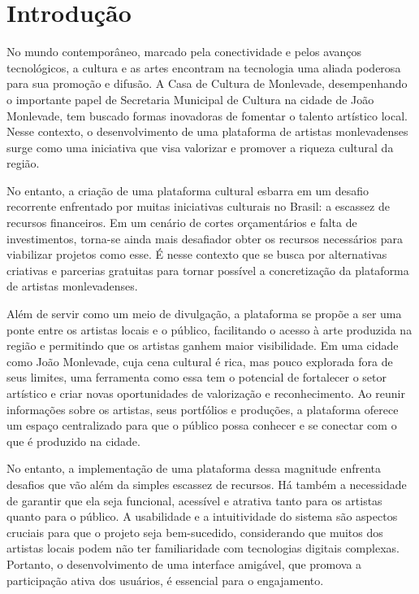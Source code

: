 \chapter{Introdução}
\label{cap:introducao}

No mundo contemporâneo, marcado pela conectividade e pelos avanços tecnológicos, a cultura e as artes encontram na tecnologia uma aliada poderosa para sua promoção e difusão. A Casa de Cultura de Monlevade, desempenhando o importante papel de Secretaria Municipal de Cultura na cidade de João Monlevade, tem buscado formas inovadoras de fomentar o talento artístico local. Nesse contexto, o desenvolvimento de uma plataforma de artistas monlevadenses surge como uma iniciativa que visa valorizar e promover a riqueza cultural da região.

No entanto, a criação de uma plataforma cultural esbarra em um desafio recorrente enfrentado por muitas iniciativas culturais no Brasil: a escassez de recursos financeiros. Em um cenário de cortes orçamentários e falta de investimentos, torna-se ainda mais desafiador obter os recursos necessários para viabilizar projetos como esse. É nesse contexto que se busca por alternativas criativas e parcerias gratuitas para tornar possível a concretização da plataforma de artistas monlevadenses.

Além de servir como um meio de divulgação, a plataforma se propõe a ser uma ponte entre os artistas locais e o público, facilitando o acesso à arte produzida na região e permitindo que os artistas ganhem maior visibilidade. Em uma cidade como João Monlevade, cuja cena cultural é rica, mas pouco explorada fora de seus limites, uma ferramenta como essa tem o potencial de fortalecer o setor artístico e criar novas oportunidades de valorização e reconhecimento. Ao reunir informações sobre os artistas, seus portfólios e produções, a plataforma oferece um espaço centralizado para que o público possa conhecer e se conectar com o que é produzido na cidade.

No entanto, a implementação de uma plataforma dessa magnitude enfrenta desafios que vão além da simples escassez de recursos. Há também a necessidade de garantir que ela seja funcional, acessível e atrativa tanto para os artistas quanto para o público. A usabilidade e a intuitividade do sistema são aspectos cruciais para que o projeto seja bem-sucedido, considerando que muitos dos artistas locais podem não ter familiaridade com tecnologias digitais complexas. Portanto, o desenvolvimento de uma interface amigável, que promova a participação ativa dos usuários, é essencial para o engajamento.

